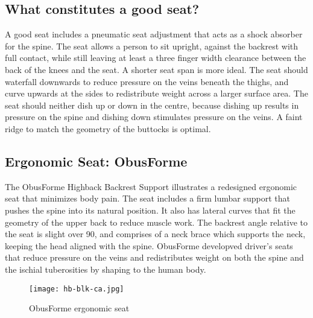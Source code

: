 \documentclass[11pt]{article}
\begin{document}
\subsection{What constitutes a good seat?}
A good seat includes a pneumatic seat adjustment that acts as a shock absorber for the spine. The seat 
allows a person to sit upright, against the backrest with full contact, while still leaving at least a 
three finger width clearance between the back of the knees and the seat. A shorter seat span is more ideal. 
The seat should waterfall downwards to reduce pressure on the veins beneath the thighs, and curve 
upwards at the sides to redistribute weight across a larger surface area. 
The seat should neither dish 
up or down in the centre, because dishing up results in pressure on the spine and dishing down stimulates pressure on the veins. 
A faint ridge to match the geometry of the buttocks is optimal\cite{ergoCentricchair2011, Natpost2005}.


\subsection{Ergonomic Seat: ObusForme}
The ObusForme Highback Backrest Support illustrates a redesigned ergonomic seat that minimizes body pain. 
The seat includes a firm lumbar support that pushes the spine into its natural position. 
It also has lateral curves that fit the geometry of the upper back to reduce muscle work\cite{ObusFormebackrest}. 
The backrest angle relative to the seat is slight over 90\textdegree, and comprises of a neck brace which supports
the neck, keeping the head aligned with the spine\cite{ObusFormedriverchair}.
ObusForme developved driver's seats that reduce pressure on the veins and redistributes weight 
on both the spine and the ischial tuberosities by shaping to the human body\cite{ObusFormecushion}.
\begin{figure}[h]
  \centering
  \texttt{[image: hb-blk-ca.jpg]}
  \caption{ObusForme ergonomic seat}
\end{figure}
\end{document}
